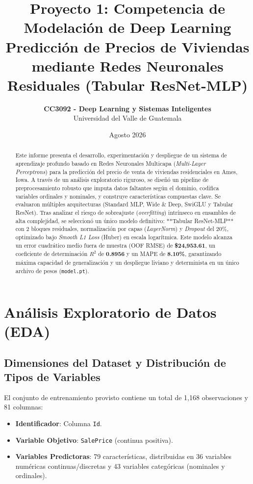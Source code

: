 \documentclass[11pt,a4paper]{article}
\title{\textbf{Proyecto 1: Competencia de Modelación de Deep Learning}\\ \Large Predicción de Precios de Viviendas mediante Redes Neuronales Residuales (Tabular ResNet-MLP)}
\author{\textbf{CC3092 - Deep Learning y Sistemas Inteligentes}\\ Universidad del Valle de Guatemala}
\date{Agosto 2026}
\begin{document}
\maketitle

\begin{abstract}
Este informe presenta el desarrollo, experimentación y despliegue de un sistema de aprendizaje profundo basado en Redes Neuronales Multicapa (\textit{Multi-Layer Perceptrons}) para la predicción del precio de venta de viviendas residenciales en Ames, Iowa. A través de un análisis exploratorio riguroso, se diseñó un pipeline de preprocesamiento robusto que imputa datos faltantes según el dominio, codifica variables ordinales y nominales, y construye características compuestas clave. Se evaluaron múltiples arquitecturas (Standard MLP, Wide \& Deep, SwiGLU y Tabular ResNet). Tras analizar el riesgo de sobreajuste (\textit{overfitting}) intrínseco en ensambles de alta complejidad, se seleccionó un único modelo definitivo: **Tabular ResNet-MLP** con 2 bloques residuales, normalización por capas (\textit{LayerNorm}) y \textit{Dropout} del 20\%, optimizado bajo \textit{Smooth L1 Loss} (Huber) en escala logarítmica. Este modelo alcanza un error cuadrático medio fuera de muestra (OOF RMSE) de \textbf{\$24,953.61}, un coeficiente de determinación $R^2$ de \textbf{0.8956} y un MAPE de \textbf{8.10\%}, garantizando máxima capacidad de generalización y un despliegue liviano y determinista en un único archivo de pesos (\texttt{model.pt}).
\end{abstract}

\tableofcontents
\newpage

\section{Análisis Exploratorio de Datos (EDA)}

\subsection{Dimensiones del Dataset y Distribución de Tipos de Variables}
El conjunto de entrenamiento provisto contiene un total de 1,168 observaciones y 81 columnas:
\begin{itemize}
    \item \textbf{Identificador}: Columna \texttt{Id}.
    \item \textbf{Variable Objetivo}: \texttt{SalePrice} (continua positiva).
    \item \textbf{Variables Predictoras}: 79 características, distribuidas en 36 variables numéricas continuas/discretas y 43 variables categóricas (nominales y ordinales).
\end{itemize}
\end{document}
